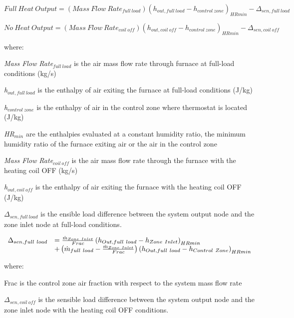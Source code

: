 \begin{equation}
Full~Heat~Output = (Mass~Flow~Rat{e_{full~load}}){({h_{out,full~load}} - {h_{control~zone}})_{HRmin}} - {\Delta_{sen,full~load}}
\end{equation}

\begin{equation}
No~Heat~Output = (Mass~Flow~Rat{e_{coil~off}}){({h_{out,coil~off}} - {h_{control~zone}})_{HRmin}} - {\Delta_{sen,coil~off}}
\end{equation}

where:

\emph{Mass Flow Rate\(_{full~load}\)} is the air mass flow rate through furnace at full-load conditions (kg/s)

\emph{h\(_{out,full~load}\)} is the enthalpy of air exiting the furnace at full-load conditions (J/kg)

\emph{h\(_{control~zone}\)} is the enthalpy of air in the control zone where thermostat is located (J/kg)

\emph{HR\(_{min}\)} are the enthalpies evaluated at a constant humidity ratio, the minimum humidity ratio of the furnace exiting air or the air in the control zone

\emph{Mass Flow Rate\(_{coil~off}\)} is the air mass flow rate through the furnace with the heating coil OFF (kg/s)

\emph{h\(_{out,coil~off}\)} is the enthalpy of air exiting the furnace with the heating coil OFF (J/kg)

\(\Delta_{sen,full~load}\) is the ensible load difference between the system output node and the zone inlet node at full-load conditions.

\begin{equation}
  \begin{array}{rl}
    \Delta_{sen,full~load} &= \frac{\dot{m}_{Zone~Inlet}}{Frac} \PB{h_{Out,full~load} - h_{Zone~Inlet}}_{HRmin} \\
                           &+ \PB{\dot{m}_{full~load} - \frac{\dot{m}_{Zone~Inlet}}{Frac}} \PB{h_{Out,full~load} - h_{Control~Zone}}_{HRmin}
  \end{array}
\end{equation}

where:

Frac is the control zone air fraction with respect to the system mass flow rate

\(\Delta_{sen,coil~off}\) is the sensible load difference between the system output node and the zone inlet node with the heating coil OFF conditions.

